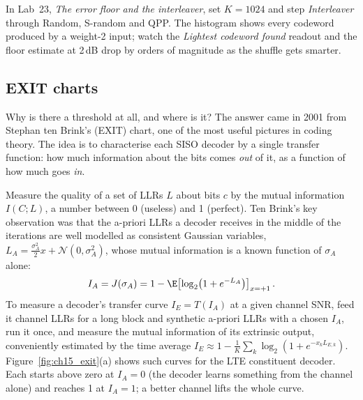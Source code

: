 \begin{tryit}
In Lab~23, \emph{The error floor and the interleaver}, set $K=1024$ and step \emph{Interleaver}
through Random, S-random and QPP. The histogram shows every codeword produced by a weight-2
input; watch the \emph{Lightest codeword found} readout and the floor estimate at 2\,dB drop by
orders of magnitude as the shuffle gets smarter.
\end{tryit}


\subsection{EXIT charts}

Why is there a threshold at all, and where is it? The answer came in 2001 from Stephan ten Brink's
 (EXIT) chart, one of the most useful pictures in coding theory.
The idea is to characterise each SISO decoder by a single transfer function: how much information
about the bits comes \emph{out} of it, as a function of how much goes \emph{in}.

Measure the quality of a set of LLRs $L$ about bits $c$ by the mutual information $I(C;L)$, a number
between 0 (useless) and 1 (perfect). Ten Brink's key observation was that the a-priori LLRs a
decoder receives in the middle of the iterations are well modelled as consistent Gaussian variables,
$L_A=\frac{\sigma_A^2}{2}x+\mathcal N(0,\sigma_A^2)$, whose mutual information is a known function
of $\sigma_A$ alone:
\begin{equation}
I_A=J(\sigma_A)=1-\E\!\left[\log_2\!\big(1+e^{-L_A}\big)\right]_{x=+1}.
\label{eq:ch15:J}
\end{equation}
To measure a decoder's transfer curve $I_E=T(I_A)$ at a given channel SNR, feed it channel LLRs for a
long block and synthetic a-priori LLRs with a chosen $I_A$, run it once, and measure the mutual
information of its extrinsic output, conveniently estimated by the time average
$I_E\approx1-\frac1K\sum_k\log_2(1+e^{-x_kL_{E,k}})$. Figure~\ref{fig:ch15_exit}(a) shows such
curves for the LTE constituent decoder. Each starts above zero at $I_A=0$ (the decoder learns
something from the channel alone) and reaches 1 at $I_A=1$; a better channel lifts the whole curve.

